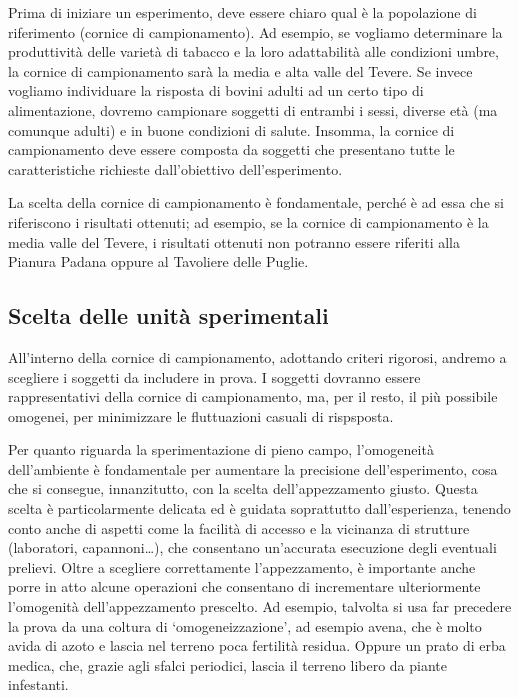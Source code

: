 \documentclass[a4paper,12pt,oneside]{book}
\begin{document}
Prima di iniziare un esperimento, deve essere chiaro qual è la popolazione di riferimento (cornice di campionamento). Ad esempio, se vogliamo determinare la produttività delle varietà di tabacco e la loro adattabilità alle condizioni umbre, la cornice di campionamento sarà la media e alta valle del Tevere. Se invece vogliamo individuare la risposta di bovini adulti ad un certo tipo di alimentazione, dovremo campionare soggetti di entrambi i sessi, diverse età (ma comunque adulti) e in buone condizioni di salute. Insomma, la cornice di campionamento deve essere composta da soggetti che presentano tutte le caratteristiche richieste dall'obiettivo dell'esperimento.

La scelta della cornice di campionamento è fondamentale, perché è ad essa che si riferiscono i risultati ottenuti; ad esempio, se la cornice di campionamento è la media valle del Tevere, i risultati ottenuti non potranno essere riferiti alla Pianura Padana oppure al Tavoliere delle Puglie.

\hypertarget{scelta-delle-unita-sperimentali}{%
\subsection{Scelta delle unità sperimentali}\label{scelta-delle-unita-sperimentali}}

All'interno della cornice di campionamento, adottando criteri rigorosi, andremo a scegliere i soggetti da includere in prova. I soggetti dovranno essere rappresentativi della cornice di campionamento, ma, per il resto, il più possibile omogenei, per minimizzare le fluttuazioni casuali di rispsposta.

Per quanto riguarda la sperimentazione di pieno campo, l'omogeneità dell'ambiente è fondamentale per aumentare la precisione dell'esperimento, cosa che si consegue, innanzitutto, con la scelta dell'appezzamento giusto. Questa scelta è particolarmente delicata ed è guidata soprattutto dall'esperienza, tenendo conto anche di aspetti come la facilità di accesso e la vicinanza di strutture (laboratori, capannoni\ldots{}), che consentano un'accurata esecuzione degli eventuali prelievi. Oltre a scegliere correttamente l'appezzamento, è importante anche porre in atto alcune operazioni che consentano di incrementare ulteriormente l'omogenità dell'appezzamento prescelto. Ad esempio, talvolta si usa far precedere la prova da una coltura di `omogeneizzazione', ad esempio avena, che è molto avida di azoto e lascia nel terreno poca fertilità residua. Oppure un prato di erba medica, che, grazie agli sfalci periodici, lascia il terreno libero da piante infestanti.
\end{document}
